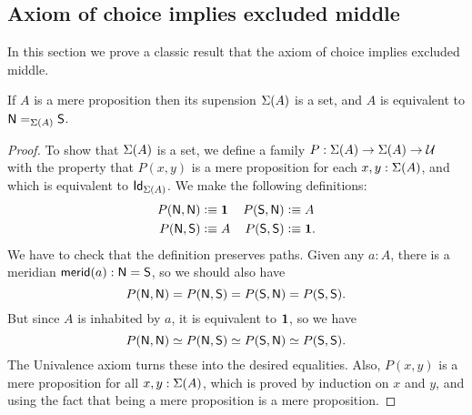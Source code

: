 \subsection{Axiom of choice implies excluded middle}
\label{subsec:emacinsets}

In this section we prove a classic result that the axiom of choice implies excluded
middle.

\begin{lem}\label{prop:trunc_of_prop_is_set}
If $A$ is a mere proposition then its supension $\susp(A)$ is a set,
and $A$ is equivalent to $\id[\susp(A)]{\north}{\south}$.
\end{lem}

\begin{proof}
To show that $\susp(A)$ is a set, we define a
family $P:\susp(A)\to\susp(A)\to\type$ with the 
property that $P(x,y)$ is a mere proposition for each $x,y:\susp(A)$,
and which is equivalent to $\idtypevar{\susp(A)}$.
%
We make the following definitions:
\begin{align*}
P(\north,\north) & \defeq \unit &
P(\south,\north) & \defeq A\\
P(\north,\south) & \defeq A &
P(\south,\south) & \defeq \unit.
\end{align*}
We have to check that the definition preserves paths.
Given any $a : A$, there is a meridian $\merid(a) : \north = \south$,
so we should also have
%
\begin{equation*}
  P(\north, \north) = P(\north, \south) = P(\south, \north) = P(\south, \south).
\end{equation*}
%
But since $A$ is inhabited by $a$, it is equivalent to $\unit$, so we have
%
\begin{equation*}
  P(\north, \north) \simeq P(\north, \south) \simeq P(\south, \north) \simeq P(\south, \south).
\end{equation*}
%
The Univalence axiom turns these into the desired equalities. Also, $P(x,y)$ is a mere
proposition for all $x, y : \susp(A)$, which is proved by induction on $x$ and $y$, and
using the fact that being a mere proposition is a mere proposition.


\end{proof}
